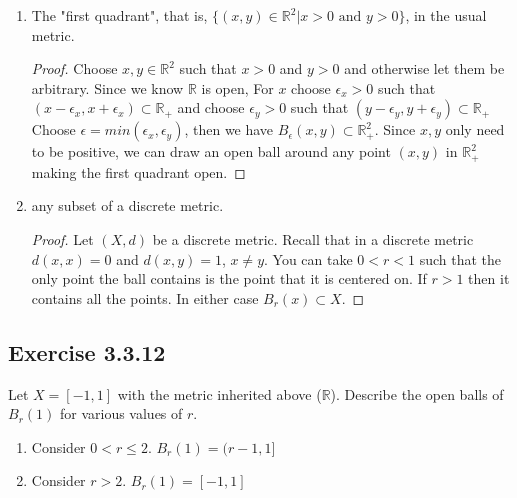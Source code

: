 \documentclass{tufte-book}
\theoremstyle{mytheoremstyle}
\theoremstyle{mylemstyle}
\theoremstyle{mydefstyle}
\begin{document}
\begin{enumerate}
\item The "first quadrant", that is, $\{(x,y) \in \mathbb{R}^2 | x > 0 \text{ and } y > 0 \}$, in the usual metric.

\begin{proof}
Choose $x, y \in \mathbb{R}^2$ such that $x > 0$ and $y > 0$ and otherwise let them be arbitrary.    Since we know $\mathbb{R}$ is open, For $x$ choose $\epsilon_x > 0$ such that $(x-\epsilon_x, x+\epsilon_x) \subset \mathbb{R}_+$ and choose $\epsilon_y >0$ such that $(y-\epsilon_y, y+\epsilon_y) \subset \mathbb{R}_+$   Choose $\epsilon = min(\epsilon_x, \epsilon_y)$, then we have $B_\epsilon(x,y) \subset \mathbb{R}_+^2$.  Since $x,y$ only need to be positive, we can draw an open ball around any point $(x,y)$ in $\mathbb{R}_+^2$ making the first quadrant open.
\end{proof}

\item any subset of a discrete metric.

\begin{proof}
Let $(X, d)$ be a discrete metric.  Recall that in a discrete metric $d(x,x) = 0$ and $d(x,y)=1$, $x \neq y$.   You can take $0<r<1$ such that the only point the ball contains is the point that it is centered on.  If $r>1$ then it contains all the points.  In either case $B_r(x) \subset X$.
\end{proof}
\end{enumerate}

\subsection{Exercise 3.3.12}
Let $X = [-1,1]$ with the metric inherited above ($\mathbb{R}$).  Describe the open balls of $B_r(1)$ for various values of $r$.

\begin{enumerate}

\item Consider $0< r \leq 2$.  $B_r(1) = (r-1, 1]$
\item Consider $r > 2$. $B_r(1) = [-1,1]$ 
\end{enumerate}
\end{document}
